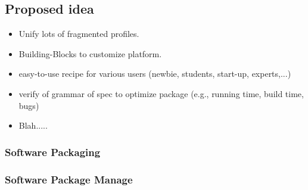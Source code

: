 \subsection{Proposed idea}
\begin{itemize}
	\item Unify lots of fragmented profiles.
	\item Building-Blocks to customize platform.
	\item easy-to-use recipe for various users (newbie, students, start-up, experts,...)
    \item verify of grammar of spec to optimize package (e.g., running time, build time, bugs)
    \item Blah.....
\end{itemize}

\subsubsection{Software Packaging}
\subsubsection{Software Package Manage}